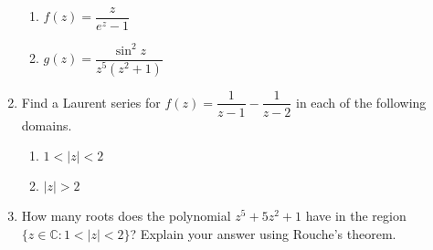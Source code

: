 \documentclass[11pt]{article}
\newcommand{\ds}{\displaystyle}
\newcommand{\C}{\mathbb{C}}
\begin{document}
\begin{enumerate}
\begin{multicols}{2}
\begin{enumerate}
\item $f(z) = \dfrac{z}{e^z - 1}$ 
\item $g(z) = \dfrac{\sin^2 z}{z^5(z^2+1)}$
\end{enumerate}
\end{multicols}
\vfill

\item Find a Laurent series for $f(z) = \dfrac{1}{z-1} - \dfrac{1}{z-2}$ in each of the following domains.
\begin{multicols}{2}
\begin{enumerate}
\item $1 < |z| < 2$
\item $|z| > 2$ 
\end{enumerate}
\end{multicols}
\vfill

\item How many roots does the polynomial $z^5 + 5z^2 + 1$ have in the region $\{z \in \C : 1 < |z| < 2\}$?  Explain your answer using Rouche's theorem.  
\vfill

%
\end{enumerate}
\end{document}
